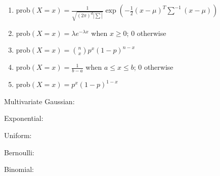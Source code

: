 \documentclass[11pt,addpoints,answers]{exam}
\numberwithin{equation}{section} %
\numberwithin{figure}{section} %
\numberwithin{table}{section} %
\begin{document}
\begin{questions}
    
    \begin{enumerate}
        \item  prob$(X=x) = \frac{1}{\sqrt{(2\pi)^d |\sum|}}\exp(-\frac{1}{2}(x - \mu)^T\sum^{-1}(x-\mu))$
        \item  prob$(X=x) = \lambda e^{-\lambda x}$ when $x \geq 0$; 0 otherwise
        \item  prob$(X=x) = \binom{n}{x} p^x (1-p)^{n-x}$
        \item  prob$(X=x) = \frac{1}{b-a}$ when $a \leq x \leq b$; 0 otherwise
        \item  prob$(X=x) = p^x(1-p)^{1-x}$
    \end{enumerate}
    
    \begin{list}{}
        \item Multivariate Gaussian:  \qquad
            \begin{tcolorbox}[fit,height=1cm, width=2cm, blank, borderline={1pt}{-2pt},nobeforeafter]
            \end{tcolorbox}
        \item Exponential:  \qquad
            \begin{tcolorbox}[fit,height=1cm, width=2cm, blank, borderline={1pt}{-2pt},nobeforeafter]
            \end{tcolorbox}
        \item Uniform:  \qquad         
            \begin{tcolorbox}[fit,height=1cm, width=2cm, blank, borderline={1pt}{-2pt},nobeforeafter]
            \end{tcolorbox}
        \item Bernoulli:  \qquad             
            \begin{tcolorbox}[fit,height=1cm, width=2cm, blank, borderline={1pt}{-2pt},nobeforeafter]
            \end{tcolorbox}
        \item Binomial:  \qquad             
            \begin{tcolorbox}[fit,height=1cm, width=2cm, blank, borderline={1pt}{-2pt},nobeforeafter]
            \end{tcolorbox}
    \end{list}

    
    
    
    

    \clearpage
\end{questions}
\end{document}

